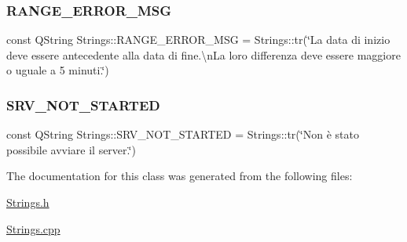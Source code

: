 \mbox{\label{class_strings_a314de68dc2eaf06f2a61f82ed6208be2}} 
\subsubsection{\texorpdfstring{R\+A\+N\+G\+E\+\_\+\+E\+R\+R\+O\+R\+\_\+\+M\+SG}{RANGE\_ERROR\_MSG}}
{\footnotesize\ttfamily const Q\+String Strings\+::\+R\+A\+N\+G\+E\+\_\+\+E\+R\+R\+O\+R\+\_\+\+M\+SG = Strings\+::tr(\char`\"{}La data di inizio deve essere antecedente alla data di fine.\textbackslash{}n\+La loro differenza deve essere maggiore o uguale a 5 minuti.\char`\"{})\hspace{0.3cm}{\ttfamily [static]}}

\mbox{\label{class_strings_a17e0c187646157ce7a83194fdab54d39}} 
\subsubsection{\texorpdfstring{S\+R\+V\+\_\+\+N\+O\+T\+\_\+\+S\+T\+A\+R\+T\+ED}{SRV\_NOT\_STARTED}}
{\footnotesize\ttfamily const Q\+String Strings\+::\+S\+R\+V\+\_\+\+N\+O\+T\+\_\+\+S\+T\+A\+R\+T\+ED = Strings\+::tr(\char`\"{}Non è stato possibile avviare il server.\char`\"{})\hspace{0.3cm}{\ttfamily [static]}}



The documentation for this class was generated from the following files\+:\begin{DoxyCompactItemize}
\item 
\hyperlink{_strings_8h}{Strings.\+h}\item 
\hyperlink{_strings_8cpp}{Strings.\+cpp}\end{DoxyCompactItemize}
